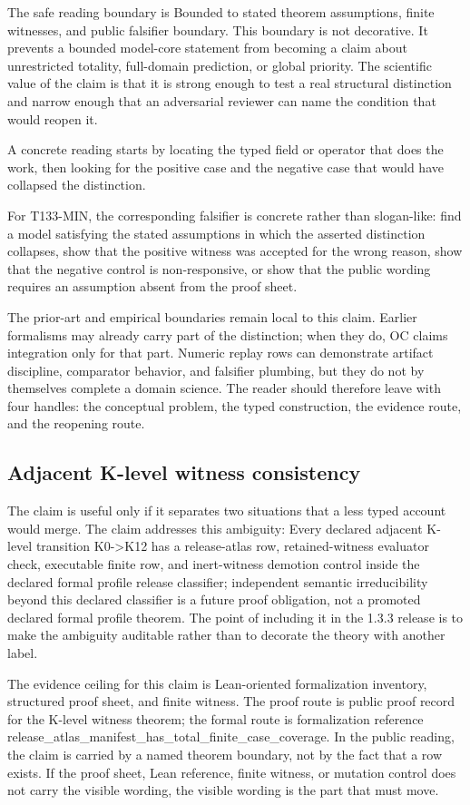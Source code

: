 The safe reading boundary is Bounded to stated theorem assumptions, finite witnesses, and public falsifier boundary. This boundary is not decorative. It prevents a bounded model-core statement from becoming a claim about unrestricted totality, full-domain prediction, or global priority. The scientific value of the claim is that it is strong enough to test a real structural distinction and narrow enough that an adversarial reviewer can name the condition that would reopen it.

A concrete reading starts by locating the typed field or operator that does the work, then looking for the positive case and the negative case that would have collapsed the distinction.

For T133-MIN, the corresponding falsifier is concrete rather than slogan-like: find a model satisfying the stated assumptions in which the asserted distinction collapses, show that the positive witness was accepted for the wrong reason, show that the negative control is non-responsive, or show that the public wording requires an assumption absent from the proof sheet.

The prior-art and empirical boundaries remain local to this claim. Earlier formalisms may already carry part of the distinction; when they do, OC claims integration only for that part. Numeric replay rows can demonstrate artifact discipline, comparator behavior, and falsifier plumbing, but they do not by themselves complete a domain science. The reader should therefore leave with four handles: the conceptual problem, the typed construction, the evidence route, and the reopening route.

\subsection{Adjacent K-level witness consistency}
The claim is useful only if it separates two situations that a less typed account would merge. The claim addresses this ambiguity: Every declared adjacent K-level transition K0-\textgreater{}K12 has a release-atlas row, retained-witness evaluator check, executable finite row, and inert-witness demotion control inside the declared formal profile release classifier; independent semantic irreducibility beyond this declared classifier is a future proof obligation, not a promoted declared formal profile theorem. The point of including it in the 1.3.3 release is to make the ambiguity auditable rather than to decorate the theory with another label.

The evidence ceiling for this claim is Lean-oriented formalization inventory, structured proof sheet, and finite witness. The proof route is public proof record for the K-level witness theorem; the formal route is formalization reference release\_atlas\_manifest\_has\_total\_finite\_case\_coverage. In the public reading, the claim is carried by a named theorem boundary, not by the fact that a row exists. If the proof sheet, Lean reference, finite witness, or mutation control does not carry the visible wording, the visible wording is the part that must move.


